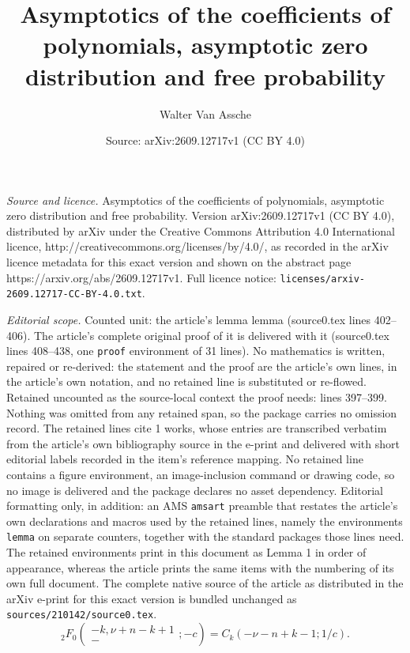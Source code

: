 \documentclass[10pt,a4paper]{amsart}
\title{Asymptotics of the coefficients of polynomials, asymptotic zero distribution and free probability}
\author{Walter Van Assche}
\date{Source: arXiv:2609.12717v1 (CC BY 4.0)}
\begin{document}
\maketitle

\noindent\emph{Source and licence.} Asymptotics of the coefficients of polynomials, asymptotic zero distribution and free probability. Version arXiv:2609.12717v1 (CC BY 4.0), distributed by arXiv under the Creative Commons Attribution 4.0 International licence, http://creativecommons.org/licenses/by/4.0/, as recorded in the arXiv licence metadata for this exact version and shown on the abstract page https://arxiv.org/abs/2609.12717v1. Full licence notice: \texttt{licenses/arxiv-2609.12717-CC-BY-4.0.txt}.\par\smallskip

\noindent\textit{Editorial scope.} Counted unit: the article's lemma lemma (source0.tex lines 402--406). The article's complete original proof of it is delivered with it (source0.tex lines 408--438, one \texttt{proof} environment of 31 lines). No mathematics is written, repaired or re-derived: the statement and the proof are the article's own lines, in the article's own notation, and no retained line is substituted or re-flowed.  Retained uncounted as the source-local context the proof needs: lines 397--399.  Nothing was omitted from any retained span, so the package carries no omission record.  The retained lines cite 1 works, whose entries are transcribed verbatim from the article's own bibliography source in the e-print and delivered with short editorial labels recorded in the item's reference mapping.  No retained line contains a figure environment, an image-inclusion command or drawing code, so no image is delivered and the package declares no asset dependency.  Editorial formatting only, in addition: an AMS \texttt{amsart} preamble that restates the article's own declarations and macros used by the retained lines, namely the environments \texttt{lemma} on separate counters, together with the standard packages those lines need.  The retained environments print in this document as Lemma 1 in order of appearance, whereas the article prints the same items with the numbering of its own full document.  The complete native source of the article as distributed in the arXiv e-print for this exact version is bundled unchanged as \texttt{sources/210142/source0.tex}.
\begin{equation}  \label{coefCharlier}
   {}_2F_0\left( \begin{array}{c}   -k, \nu+n-k+1 \\  - \end{array}; -c  \right) = C_k(-\nu-n+k-1;1/c) .
\end{equation}
\end{document}
